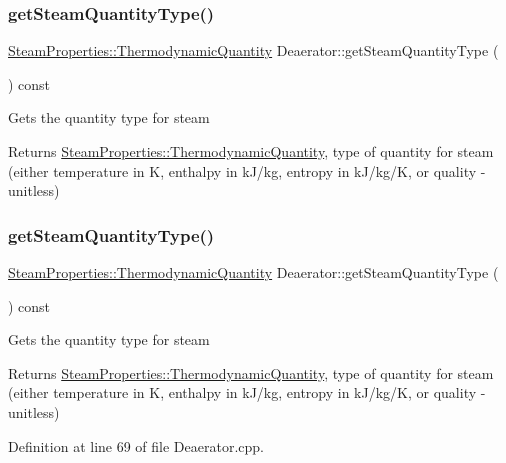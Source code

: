 \subsubsection{\texorpdfstring{get\+Steam\+Quantity\+Type()}{getSteamQuantityType()}\hspace{0.1cm}{\footnotesize\ttfamily [1/3]}}
{\footnotesize\ttfamily \hyperlink{class_steam_properties_ae0294bedf7d178c2d8fb6aed0f62fbff}{Steam\+Properties\+::\+Thermodynamic\+Quantity} Deaerator\+::get\+Steam\+Quantity\+Type (\begin{DoxyParamCaption}{ }\end{DoxyParamCaption}) const}

Gets the quantity type for steam \begin{DoxyReturn}{Returns}
\hyperlink{class_steam_properties_ae0294bedf7d178c2d8fb6aed0f62fbff}{Steam\+Properties\+::\+Thermodynamic\+Quantity}, type of quantity for steam (either temperature in K, enthalpy in k\+J/kg, entropy in k\+J/kg/K, or quality -\/ unitless) 
\end{DoxyReturn}
\mbox{\label{class_deaerator_a18abbdc5ec78f71e1d2495b0c64c77ec}} 
\subsubsection{\texorpdfstring{get\+Steam\+Quantity\+Type()}{getSteamQuantityType()}\hspace{0.1cm}{\footnotesize\ttfamily [2/3]}}
{\footnotesize\ttfamily \hyperlink{class_steam_properties_ae0294bedf7d178c2d8fb6aed0f62fbff}{Steam\+Properties\+::\+Thermodynamic\+Quantity} Deaerator\+::get\+Steam\+Quantity\+Type (\begin{DoxyParamCaption}{ }\end{DoxyParamCaption}) const}

Gets the quantity type for steam \begin{DoxyReturn}{Returns}
\hyperlink{class_steam_properties_ae0294bedf7d178c2d8fb6aed0f62fbff}{Steam\+Properties\+::\+Thermodynamic\+Quantity}, type of quantity for steam (either temperature in K, enthalpy in k\+J/kg, entropy in k\+J/kg/K, or quality -\/ unitless) 
\end{DoxyReturn}


Definition at line 69 of file Deaerator.\+cpp.

